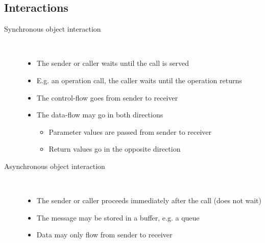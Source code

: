 \subsection{Interactions}
\begin{description}
    \item[Synchronous object interaction] $ $
          \begin{itemize}
              \item The sender or caller waits until the call is served
              \item E.g. an operation call, the caller waits until the operation returns
              \item The control-flow goes from sender to receiver
              \item The data-flow may go in both directions
                    \begin{itemize}
                        \item Parameter values are passed from sender to receiver
                        \item Return values go in the opposite direction
                    \end{itemize}
          \end{itemize}
    \item[Asynchronous object interaction]$ $
          \begin{itemize}
              \item The sender or caller proceeds immediately after the call (does not wait)
              \item The message may be stored in a buffer, e.g. a queue
              \item Data may only flow from sender to receiver
          \end{itemize}

\end{description}